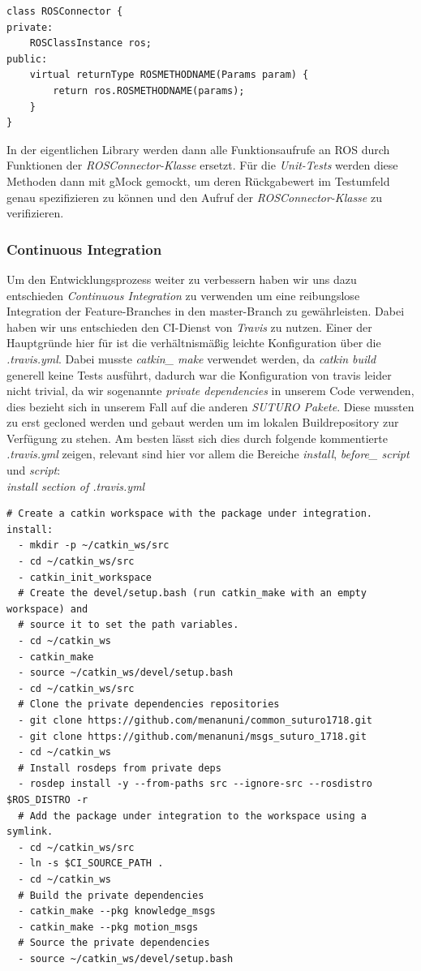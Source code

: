 \documentclass{suturo}
\begin{document}
\begin{verbatim}
class ROSConnector {
private:
    ROSClassInstance ros;
public:
    virtual returnType ROSMETHODNAME(Params param) {
        return ros.ROSMETHODNAME(params);
    }
}
\end{verbatim}

In der eigentlichen Library werden dann alle Funktionsaufrufe an ROS durch Funktionen der \textit{ROSConnector-Klasse} ersetzt. Für die \textit{Unit-Tests} werden diese Methoden dann mit gMock gemockt, um deren Rückgabewert im Testumfeld genau spezifizieren zu können und den Aufruf der \textit{ROSConnector-Klasse} zu verifizieren.



\subsubsection{Continuous Integration}
Um den Entwicklungsprozess weiter zu verbessern haben wir uns dazu entschieden \textit{Continuous Integration} zu verwenden um eine reibungslose Integration der Feature-Branches in den master-Branch zu gewährleisten. Dabei haben wir uns entschieden den CI-Dienst von \textit{Travis} zu nutzen. Einer der Hauptgründe hier für ist die verhältnismäßig leichte Konfiguration über die \textit{.travis.yml}. Dabei musste \textit{catkin\_ make} verwendet werden, da \textit{catkin build} generell keine Tests ausführt, dadurch war die Konfiguration von travis leider nicht trivial, da wir sogenannte \textit{private dependencies} in unserem Code verwenden, dies bezieht sich in unserem Fall auf die anderen \textit{SUTURO Pakete}. Diese mussten zu erst gecloned werden und gebaut werden um im lokalen Buildrepository zur Verfügung zu stehen. Am besten lässt sich dies durch folgende kommentierte \textit{.travis.yml} zeigen, relevant sind hier vor allem die Bereiche \textit{install}, \textit{before\_ script} und \textit{script}: \\

\textit{install section of .travis.yml}
\begin{verbatim}
# Create a catkin workspace with the package under integration.
install:
  - mkdir -p ~/catkin_ws/src
  - cd ~/catkin_ws/src
  - catkin_init_workspace
  # Create the devel/setup.bash (run catkin_make with an empty workspace) and
  # source it to set the path variables.
  - cd ~/catkin_ws
  - catkin_make
  - source ~/catkin_ws/devel/setup.bash
  - cd ~/catkin_ws/src
  # Clone the private dependencies repositories
  - git clone https://github.com/menanuni/common_suturo1718.git
  - git clone https://github.com/menanuni/msgs_suturo_1718.git
  - cd ~/catkin_ws 
  # Install rosdeps from private deps
  - rosdep install -y --from-paths src --ignore-src --rosdistro $ROS_DISTRO -r
  # Add the package under integration to the workspace using a symlink.
  - cd ~/catkin_ws/src
  - ln -s $CI_SOURCE_PATH .
  - cd ~/catkin_ws
  # Build the private dependencies
  - catkin_make --pkg knowledge_msgs
  - catkin_make --pkg motion_msgs
  # Source the private dependencies
  - source ~/catkin_ws/devel/setup.bash
\end{verbatim}
\end{document}
